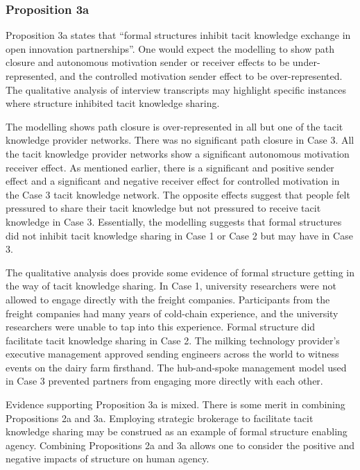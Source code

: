 \subsubsection{Proposition 3a}

Proposition 3a states that \enquote{formal structures inhibit tacit knowledge exchange in open innovation partnerships}. One would expect the modelling to show path closure and autonomous motivation sender or receiver effects to be under-represented, and the controlled motivation sender effect to be over-represented. The qualitative analysis of interview transcripts may highlight specific instances where structure inhibited tacit knowledge sharing. \medskip

The modelling shows path closure is over-represented in all but one of the tacit knowledge provider networks. There was no significant path closure in Case 3. All the tacit knowledge provider networks show a significant autonomous motivation receiver effect. As mentioned earlier, there is a significant and positive sender effect and a significant and negative receiver effect for controlled motivation in the Case 3 tacit knowledge network. The opposite effects suggest that people felt pressured to share their tacit knowledge but not pressured to receive tacit knowledge in Case 3. Essentially, the modelling suggests that formal structures did not inhibit tacit knowledge sharing in Case 1 or Case 2 but may have in Case 3. \medskip

The qualitative analysis does provide some evidence of formal structure getting in the way of tacit knowledge sharing. In Case 1, university researchers were not allowed to engage directly with the freight companies. Participants from the freight companies had many years of cold-chain experience, and the university researchers were unable to tap into this experience. Formal structure did facilitate tacit knowledge sharing in Case 2. The milking technology provider's executive management approved sending engineers across the world to witness events on the dairy farm firsthand. The hub-and-spoke management model used in Case 3 prevented partners from engaging more directly with each other. \medskip

Evidence supporting Proposition 3a is mixed. There is some merit in combining Propositions 2a and 3a. Employing strategic brokerage to facilitate tacit knowledge sharing may be construed as an example of formal structure enabling agency. Combining Propositions 2a and 3a allows one to consider the positive and negative impacts of structure on human agency. 

